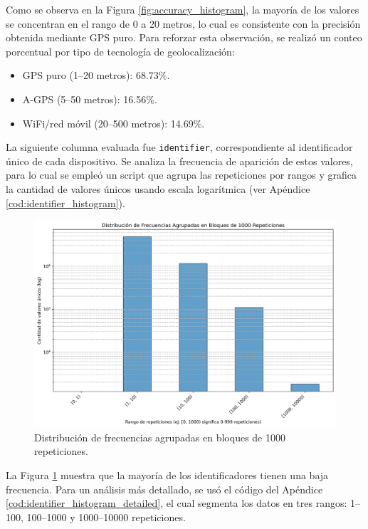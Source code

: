 Como se observa en la Figura \ref{fig:accuracy_histogram}, la mayoría de los valores se concentran en el rango de 0 a 20 metros, lo cual es consistente con la precisión obtenida mediante GPS puro. Para reforzar esta observación, se realizó un conteo porcentual por tipo de tecnología de geolocalización:

\begin{itemize}
    \item GPS puro (1–20 metros): 68.73\%.
    \item A-GPS (5–50 metros): 16.56\%.
    \item WiFi/red móvil (20–500 metros): 14.69\%.
\end{itemize}

\newpage

La siguiente columna evaluada fue \texttt{identifier}, correspondiente al identificador único de cada dispositivo. Se analiza la frecuencia de aparición de estos valores, para lo cual se empleó un script que agrupa las repeticiones por rangos y grafica la cantidad de valores únicos usando escala logarítmica (ver Apéndice \ref{cod:identifier_histogram}).

\begin{figure}[H]
    \centering
    \includegraphics[scale=0.5]{img/histograma_frecuencias_agrupadas_1000.png}
    \caption{Distribución de frecuencias agrupadas en bloques de 1000 repeticiones.}
    \label{fig:identifier_histogram}
\end{figure}

La Figura \ref{fig:identifier_histogram} muestra que la mayoría de los identificadores tienen una baja frecuencia. Para un análisis más detallado, se usó el código del Apéndice \ref{cod:identifier_histogram_detailed}, el cual segmenta los datos en tres rangos: 1–100, 100–1000 y 1000–10000 repeticiones.

